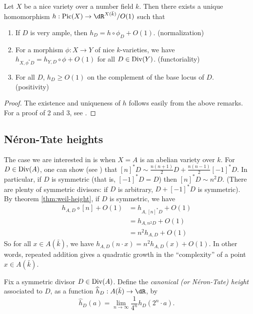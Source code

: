 \begin{theorem}\label{thm:weil-height}
Let $X$ be a nice variety over a number field $k$. Then there exists a unique 
homomorphism $h:\picard(X)\to \dR^{X(\bar k)}/O(1)$ such that 
\begin{enumerate}
  \item If $D$ is very ample, then $h_D=h\circ \phi_D+O(1)$. (normalization)
  \item For a morphism $\phi:X\to Y$ of nice $k$-varieties, we have 
    $h_{X,\phi^\ast D} = h_{Y,D}\circ\phi + O(1)$ for all $D\in \operatorname{Div}(Y)$. 
    (functoriality)
  \item For all $D$, $h_D\geqslant O(1)$ on the complement of the base locus 
    of $D$. (positivity)
\end{enumerate}
\end{theorem}
\begin{proof}
The existence and uniqueness of $h$ follows easily from the above remarks. For 
a proof of 2 and 3, see \cite[\S2.4]{bg06}. 
\end{proof}





\subsection{N\'eron-Tate heights}\label{sec:neron-tate}

The case we are interested in is when $X=A$ is an abelian variety over $k$. For 
$D\in \operatorname{Div}(A)$, one can show (see \cite[I.5.4]{mi-av}) that 
$[n]^\ast D\sim \frac{n(n+1)}{2} D + \frac{n(n-1)}{2}[-1]^\ast D$. In 
particular, if $D$ is symmetric (that is, $[-1]^\ast D=D$) then 
$[n]^\ast D\sim n^2 D$. (There are plenty of symmetric divisors: if $D$ is 
arbitrary, $D+[-1]^\ast D$ is symmetric). By theorem \ref{thm:weil-height}, 
if $D$ is symmetric, we have 
\begin{align*}
  h_{A,D}\circ[n]+O(1)
    &= h_{A,[n]^\ast D} + O(1) \\
    &= h_{A,n^2 D}+O(1) \\
    &= n^2 h_{A,D}+O(1)
\end{align*}
So for all $x\in A(\bar k)$, we have 
$h_{A,D}(n\cdot x) = n^2 h_{A,D}(x)+O(1)$. In other words, repeated addition 
gives a quadratic growth in the ``complexity'' of a point $x\in A(\bar k)$. 

Fix a symmetric divisor $D\in \operatorname{Div}(A)$. Define the \emph{canonical (or 
N\'eron-Tate) height} associated to $D$, as a function 
$\widehat h_D:A(\bar k)\to \dR$, by 
\[
  \widehat h_D(a) = \lim_{n\to \infty} \frac{1}{4^n} h_D(2^n\cdot a) \text{.}
\]


